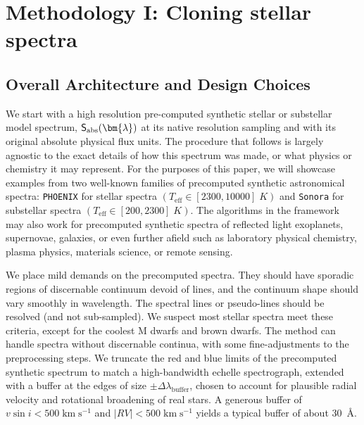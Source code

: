 \documentclass[trackchanges]{aastex631}
\def\kmps{\mathrm{km}\;\mathrm{s}^{-1}}
\begin{document}
\section{Methodology I: Cloning stellar spectra}\label{methodology}


\subsection{Overall Architecture and Design Choices}

We start with a high resolution pre-computed synthetic stellar or substellar model spectrum, $\mathsf{S}_{\rm abs}(\bm{\lambda})$ at its native resolution sampling and with its original absolute physical flux units. The procedure that follows is largely agnostic to the exact details of how this spectrum was made, or what physics or chemistry it may represent. For the purposes of this paper, we will showcase examples from two well-known families of precomputed synthetic astronomical spectra: \texttt{PHOENIX} \citep{husser13} for stellar spectra $(T_{\mathrm{eff}}\in [2300, 10000]\;K)$ and \texttt{Sonora} \citep{2021ApJ...920...85M} for substellar spectra $(T_{\mathrm{eff}}\in [200, 2300]\;K)$. The algorithms in the framework may also work for precomputed synthetic spectra of reflected light exoplanets, supernovae, galaxies, or even further afield such as laboratory physical chemistry, plasma physics, materials science, or remote sensing.

We place mild demands on the precomputed spectra. They should have sporadic regions of discernable continuum devoid of lines, and the continuum shape should vary smoothly in wavelength. The spectral lines or pseudo-lines should be resolved (and not sub-sampled). We suspect most stellar spectra meet these criteria, except for the coolest M dwarfs and brown dwarfs. The method can handle spectra without discernable continua, with some fine-adjustments to the preprocessing steps. We truncate the red and blue limits of the precomputed synthetic spectrum to match a high-bandwidth echelle spectrograph, extended with a buffer at the edges of size $\pm \Delta \lambda_{\mathrm{buffer}}$, chosen to account for plausible radial velocity and rotational broadening of real stars. A generous buffer of $v \sin{i} < 500 \;\kmps$ and $|RV|<500 \;\kmps$ yields a typical buffer of about 30~\AA.
\end{document}
